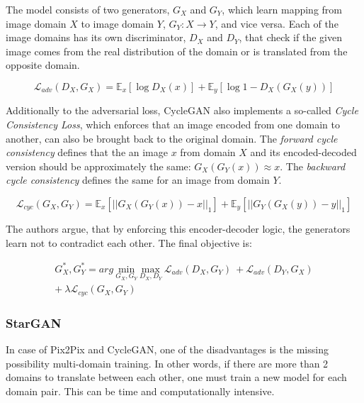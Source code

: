 \documentclass{article}
\begin{document}
The model consists of two generators, $G_{X}$ and $G_{Y}$, which learn mapping from image domain $X$ to image domain $Y$, $G_{Y}: X \rightarrow Y$, and vice versa. Each of the image domains has its own discriminator, $D_{X}$ and $D_{Y}$, that check if the given image comes from the real distribution of the domain or is translated from the opposite domain.

\begin{equation}
\mathcal{L}_{adv}(D_{X},G_{X}) = \mathbb{E}_{x}[\log D_{X}(x)] + \mathbb{E}_{y}[\log 1 - D_{X}(G_{X}(y))]
\label{eq:cyclegan_adv}
\end{equation}

Additionally to the adversarial loss, CycleGAN also implements a so-called \textit{Cycle Consistency Loss}, which enforces that an image encoded from one domain to another, can also be brought back to the original domain. The \textit{forward cycle consistency} defines that the  an image $x$ from domain $X$ and its encoded-decoded version should be approximately the same: $G_{X}(G_{Y}(x)) \approx x$. The \textit{backward cycle consistency} defines the same for an image from domain $Y$.

\begin{equation}
\mathcal{L}_{cyc}(G_{X},G_{Y}) = \mathbb{E}_{x}[||G_{X}(G_{Y}(x)) - x||_{1}] + \mathbb{E}_{y}[||G_{Y}(G_{X}(y)) - y||_{1}]
\label{eq:cyclegan_cycle}
\end{equation}

The authors argue, that by enforcing this encoder-decoder logic, the generators learn not to contradict each other. The final objective is:

\begin{equation}
\begin{split}
G^{*}_{X}, G^{*}_{Y} = arg \ \underset{G_{X}, G_{Y}}{\mathrm{min}} \ \underset{D_{X}, D_{Y}}{\mathrm{max}} \ \mathcal{L}_{adv}(D_{X},G_{Y}) \ +  \mathcal{L}_{adv}(D_{Y}, G_{X}) \\ + \ \lambda \mathcal{L}_{cyc}(G_{X}, G_{Y})
\end{split}
\end{equation}

\subsubsection{StarGAN}
In case of Pix2Pix and CycleGAN, one of the disadvantages is the missing possibility multi-domain training. In other words, if there are more than 2 domains to translate between each other, one must train a new model for each domain pair. This can be time and computationally intensive.
\end{document}
